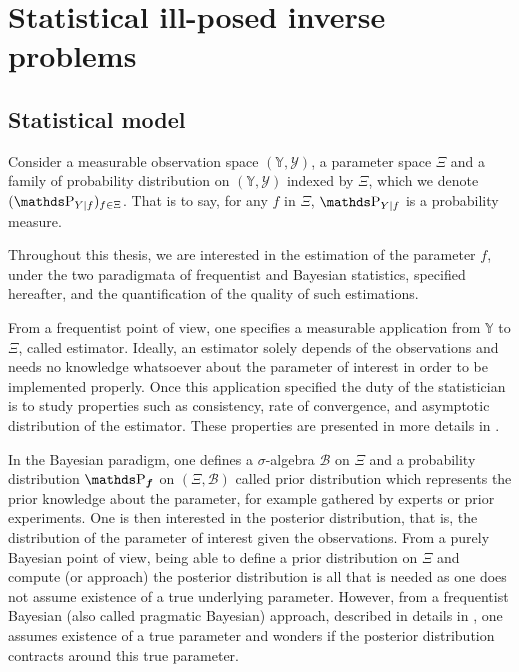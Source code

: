 \section{Statistical ill-posed inverse problems}\label{INTRO_INVERSE}

\subsection{Statistical model}\label{INTRO_INVERSE_STATMOD}

Consider a measurable observation space $(\mathds{Y}, \mathcal{Y})$, a parameter space $\Xi$ and a family of probability distribution on $(\mathds{Y}, \mathcal{Y})$ indexed by $\Xi$, which we denote $(\P_{Y \vert f})_{f \in \Xi}$.
That is to say, for any $f$ in $\Xi$, $\P_{Y \vert f}$ is a probability measure.

\bigskip

Throughout this thesis, we are interested in the estimation of the parameter $f$, under the two paradigmata of frequentist and Bayesian statistics, specified hereafter, and the quantification of the quality of such estimations.

From a frequentist point of view, one specifies a measurable application from $\mathds{Y}$ to $\Xi$, called estimator.
Ideally, an estimator solely depends of the observations and needs no knowledge whatsoever about the parameter of interest in order to be implemented properly.
Once this application specified the duty of the statistician is to study properties such as consistency, rate of convergence, and asymptotic distribution of the estimator.
These properties are presented in more details in .

\medskip

In the Bayesian paradigm, one defines a $\sigma$-algebra $\mathcal{B}$ on $\Xi$ and a probability distribution $\P_{\boldsymbol{f}}$ on $(\Xi, \mathcal{B})$ called prior distribution which represents the prior knowledge about the parameter, for example gathered by experts or prior experiments.
One is then interested in the posterior distribution, that is, the distribution of the parameter of interest given the observations.
From a purely Bayesian point of view, being able to define a prior distribution on $\Xi$ and compute (or approach) the posterior distribution is all that is needed as one does not assume existence of a true underlying parameter.
However, from a frequentist Bayesian (also called pragmatic Bayesian) approach, described in details in , one assumes existence of a true parameter and wonders if the posterior distribution contracts around this true parameter.


